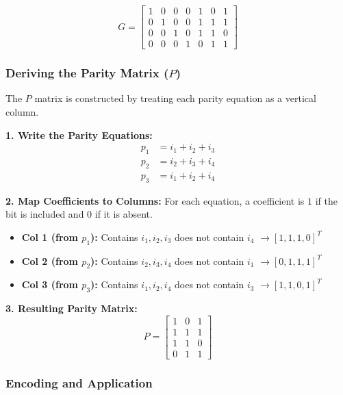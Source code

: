 \documentclass[11pt,a4paper]{book}
\newenvironment{formulabox}[1][Formula]{%
    \begin{tcolorbox}[
        enhanced,
        breakable,
        colback=softcoral!10,
        colframe=softcoral!200,
        title=#1,
        fonttitle=\bfseries,
        coltitle=white,
        sharp corners,
        boxrule=1pt,
        left=8pt,
        right=8pt,
        top=6pt,
        bottom=6pt
    ]
}{\end{tcolorbox}}
\begin{document}
\[
G = \left[ \begin{array}{cccc|ccc}
1 & 0 & 0 & 0 & 1 & 0 & 1 \\
0 & 1 & 0 & 0 & 1 & 1 & 1 \\
0 & 0 & 1 & 0 & 1 & 1 & 0 \\
0 & 0 & 0 & 1 & 0 & 1 & 1
\end{array} \right]
\]

\subsubsection{Deriving the Parity Matrix ($P$)}

\begin{formulabox}[Building the Parity Matrix Part]
The $P$ matrix is constructed by treating each parity equation as a vertical column. 

\textbf{1. Write the Parity Equations:}
\begin{align*}
p_1 &= i_1 + i_2 + i_3 \\
p_2 &= i_2 + i_3 + i_4 \\
p_3 &= i_1 + i_2 + i_4
\end{align*}

\textbf{2. Map Coefficients to Columns:}
For each equation, a coefficient is $1$ if the bit is included and $0$ if it is absent.
\begin{itemize}
    \item \textbf{Col 1 (from $p_1$):} Contains $i_1, i_2, i_3$ does not contain $i_4$ $\rightarrow [1, 1, 1, 0]^T$
    \item \textbf{Col 2 (from $p_2$):} Contains $i_2, i_3, i_4$ does not contain $i_1$ $\rightarrow [0, 1, 1, 1]^T$
    \item \textbf{Col 3 (from $p_3$):} Contains $i_1, i_2, i_4$ does not contain $i_3$ $\rightarrow [1, 1, 0, 1]^T$
\end{itemize}

\textbf{3. Resulting Parity Matrix:}
\[
P = \begin{bmatrix}
1 & 0 & 1 \\
1 & 1 & 1 \\
1 & 1 & 0 \\
0 & 1 & 1
\end{bmatrix}
\]
\end{formulabox}

\subsubsection{Encoding and Application}
\end{document}
